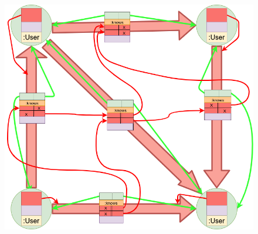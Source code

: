 \documentclass[rgb]{beamer}
\begin{document}
                    \begin{frame}
                    \vspace{-3.5em}
                    \begin{figure}
                     \begin{center}
                      \includegraphics[keepaspectratio, height=1.2\textheight, width=\textwidth]{img/example_structs.png}
                     \end{center}
                    \end{figure}
                \end{frame}
        
\end{document}
